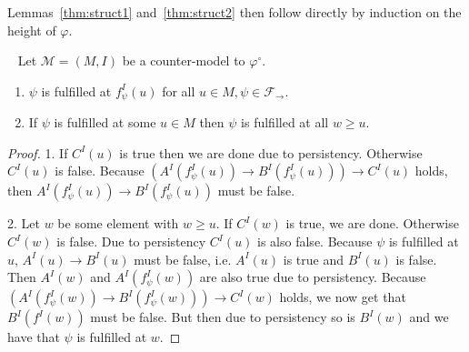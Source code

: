 \documentclass[a4paper,UKenglish,cleveref, autoref, thm-restate]{lipics-v2021}
\begin{document}
Lemmas~\ref{thm:struct1} and~\ref{thm:struct2} then follow directly by induction on the height of $\varphi$.

\begin{lemma}~\label{thm:prop-countermodel-reduction2}
	Let $\mathcal M = (M, I)$ be a counter-model to $\mathcal \varphi^\circ$.
	\begin{enumerate}
		\item $\psi$ is fulfilled at $f_\psi^I(u)$ for all $u\in M, \psi\in\mathcal F_\to$.
		\item If $\psi$ is fulfilled at some $u\in M$ then $\psi$ is fulfilled at all $w\geq u$.
	\end{enumerate}
\end{lemma}

\begin{proof}
	1. If $C^I(u)$ is true then we are done due to persistency. Otherwise $C^I(u)$ is false.
	Because $(A^I(f_\psi^I(u))\to B^I(f_\psi^I(u)))\to C^I(u)$ holds, then $A^I(f_\psi^I(u))\to B^I(f_\psi^I(u))$ must be false.
	
	
	2. Let $w$ be some element with $w\geq u$.
	If $C^I(w)$ is true, we are done.
	Otherwise $C^I(w)$ is false.
	Due to persistency $C^I(u)$ is also false.
	Because $\psi$ is fulfilled at $u$, $A^I(u)\to B^I(u)$ must be false, i.e. $A^I(u)$ is true and $B^I(u)$ is false. Then $A^I(w)$ and $A^I(f^I_\psi(w))$ are also true due to persistency.
	Because $(A^I(f^I_\psi(w))\to B^I(f^I_\psi(w)))\to C^I(w)$ holds, we now get that  $B^I(f^I(w))$ must be false.
	But then due to persistency so is $B^I(w)$ and we have that $\psi$ is fulfilled at $w$.
\end{proof}
\end{document}
